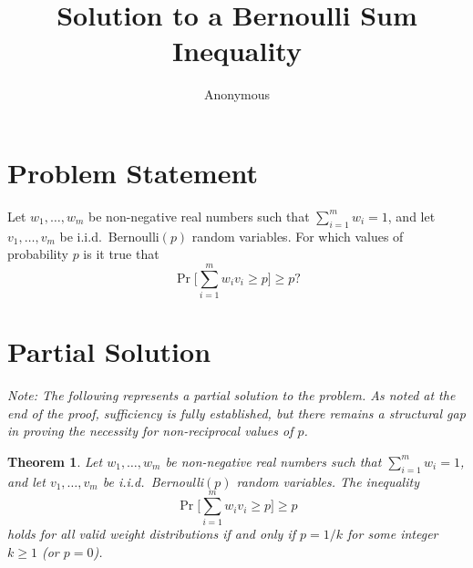 \documentclass[12pt]{article}
\title{Solution to a Bernoulli Sum Inequality}
\author{Anonymous}
\date{}
\newtheorem{theorem}{Theorem}
\begin{document}
\maketitle

\section*{Problem Statement}

Let $w_1, \ldots, w_m$ be non-negative real numbers such that $\sum_{i=1}^m w_i=1$, and let $v_1, \ldots, v_m$ be i.i.d.\ Bernoulli$(p)$ random variables. For which values of probability $p$ is it true that
\[\Pr\Big[\sum_{i=1}^m w_i v_i\geq p\Big]\geq p?\]

\section*{Partial Solution}

\textit{Note: The following represents a partial solution to the problem. As noted at the end of the proof, sufficiency is fully established, but there remains a structural gap in proving the necessity for non-reciprocal values of $p$.}

\begin{theorem}
Let $w_1, \ldots, w_m$ be non-negative real numbers such that $\sum_{i=1}^m w_i = 1$, and let $v_1, \ldots, v_m$ be i.i.d.\ Bernoulli$(p)$ random variables. The inequality 
\[\Pr\Big[\sum_{i=1}^m w_i v_i\geq p\Big]\geq p\]
holds for all valid weight distributions if and only if $p = 1/k$ for some integer $k \ge 1$ (or $p=0$).
\end{theorem}
\end{document}
